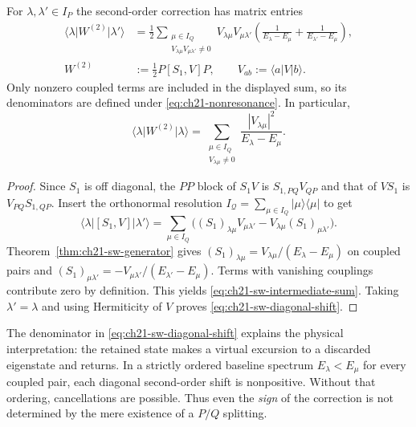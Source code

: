 \begin{proposition}
\label{prop:ch21-sw-intermediate}
For $\lambda,\lambda'\in I_P$ the second-order correction has matrix
entries
\begin{equation}
\begin{aligned}
\langle\lambda\lvert W^{(2)}\rvert\lambda'\rangle
  &=\frac12\sum_{\substack{\mu\in I_Q\\
       V_{\lambda\mu}V_{\mu\lambda'}\ne0}}
  V_{\lambda\mu}V_{\mu\lambda'}
  \left(\frac{1}{E_\lambda-E_\mu}
        +\frac{1}{E_{\lambda'}-E_\mu}\right),\\
W^{(2)}&:=\frac12P[S_1,V]P,
\qquad V_{ab}:=\langle a\lvert V\rvert b\rangle.
\end{aligned}
\label{eq:ch21-sw-intermediate-sum}
\end{equation}
Only nonzero coupled terms are included in the displayed sum, so its
denominators are defined under \eqref{eq:ch21-nonresonance}.  In
particular,
\begin{equation}
\langle\lambda\lvert W^{(2)}\rvert\lambda\rangle
 =\sum_{\substack{\mu\in I_Q\\V_{\lambda\mu}\ne0}}
 \frac{|V_{\lambda\mu}|^2}{E_\lambda-E_\mu}.
\label{eq:ch21-sw-diagonal-shift}
\end{equation}
\end{proposition}
\begin{proof}
Since $S_1$ is off diagonal, the $PP$ block of $S_1V$ is
$S_{1,PQ}V_{QP}$ and that of $VS_1$ is $V_{PQ}S_{1,QP}$.
Insert the orthonormal resolution $I_{\mathcal Q}=\sum_{\mu\in I_Q}
\lvert\mu\rangle\langle\mu\rvert$ to get
\begin{equation*}
\langle\lambda\lvert[S_1,V]\rvert\lambda'\rangle
=\sum_{\mu\in I_Q}\bigl((S_1)_{\lambda\mu}
 V_{\mu\lambda'}-V_{\lambda\mu}(S_1)_{\mu\lambda'}\bigr).
\end{equation*}
Theorem~\ref{thm:ch21-sw-generator} gives
$(S_1)_{\lambda\mu}=V_{\lambda\mu}/(E_\lambda-E_\mu)$
on coupled pairs and
$(S_1)_{\mu\lambda'}=-V_{\mu\lambda'}/(E_{\lambda'}-E_\mu)$.
Terms with vanishing couplings contribute zero by definition.  This
yields \eqref{eq:ch21-sw-intermediate-sum}.  Taking
$\lambda'=\lambda$ and using Hermiticity of $V$ proves
\eqref{eq:ch21-sw-diagonal-shift}.
\end{proof}

The denominator in \eqref{eq:ch21-sw-diagonal-shift} explains the
physical interpretation: the retained state makes a virtual excursion
to a discarded eigenstate and returns.  In a strictly ordered baseline
spectrum $E_\lambda<E_\mu$ for every coupled pair, each diagonal
second-order shift is nonpositive.  Without that ordering, cancellations
are possible.  Thus even the \emph{sign} of the correction is not
determined by the mere existence of a $P/Q$ splitting.

